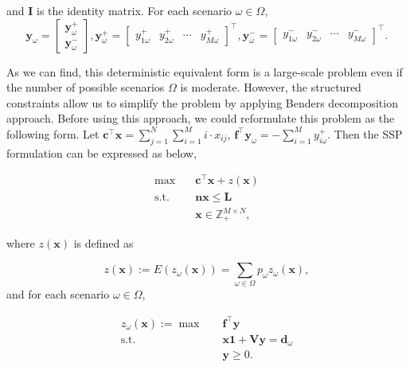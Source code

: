 and $\mathbf{I}$ is the identity matrix. For each scenario $\omega \in \Omega$,
$$
\mathbf{y}_{\omega}=\left[\begin{array}{l}
\mathbf{y}_{\omega}^{+} \\
\mathbf{y}_{\omega}^{-}
\end{array}\right], \mathbf{y}_{\omega}^{+}=\left[\begin{array}{lllll}y_{1 \omega}^{+} & y_{2 \omega}^{+} & \cdots & y_{M \omega}^{+}\end{array}\right]^{\intercal}, \mathbf{y}_{\omega}^{-}=\left[\begin{array}{llll}y_{1 \omega}^{-} & y_{2 \omega}^{-} & \cdots & y_{M \omega}^{-}\end{array}\right]^{\intercal}.
$$

As we can find, this deterministic equivalent form is a large-scale problem even if the number of possible scenarios $\Omega$ is moderate. However, the structured constraints allow us to simplify the problem by applying Benders decomposition approach. Before using this approach, we could reformulate this problem as the following form. Let $\mathbf{c}^{\intercal}\mathbf{x} = \sum_{j =1}^{N} \sum_{i=1}^M i \cdot x_{ij}$, $\mathbf{f}^{\intercal}\mathbf{y}_{\omega} = -\sum_{i=1}^{M} y_{i \omega}^{+}$. Then the SSP formulation can be expressed as below,

\begin{equation}\label{BD_master}
\begin{aligned}
\max \quad & \mathbf{c}^{\intercal} \mathbf{x}+ z(\mathbf{x}) \\
\text {s.t.} \quad & \mathbf{n} \mathbf{x} \leq \mathbf{L} \\
& \mathbf{x} \in \mathbb{Z}_{+}^{M \times N},
\end{aligned}
\end{equation}

where $z(\mathbf{x})$ is defined as

$$z(\mathbf{x}) := E(z_{\omega}(\mathbf{x})) = \sum_{\omega \in \Omega} p_{\omega} z_{\omega}(\mathbf{x}),$$ and for each scenario $\omega \in \Omega$, 

\begin{equation}\label{BD_sub}
  \begin{aligned}
    z_{\omega}(\mathbf{x}) := \max \quad & \mathbf{f}^{\intercal} \mathbf{y} \\
    \text {s.t.} \quad & \mathbf{x} \mathbf{1} + \mathbf{V} \mathbf{y} = \mathbf{d}_{\omega} \\
     & \mathbf{y} \geq 0.
  \end{aligned}
\end{equation}

